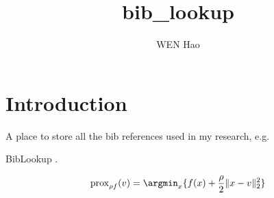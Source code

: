 \documentclass{article}
\title{bib\_lookup}
\author{WEN Hao}
\date{}
\begin{document}
\maketitle

\section{Introduction}

A place to store all the bib references used in my research, e.g. \cite{Wen_cpsc2021,torch_ecg_paper,Kang_2022_cinc2021_iop,wen_cinc2021,Pang_2021_SpineParseNet,kiyasseh2021clocs}

BibLookup \cite{bib_lookup}.

$$\operatorname{prox}_{\rho f}(v) = \argmin_x \{f(x) + \dfrac{\rho}{2} \lVert x-v \rVert_2^2\}$$













\printbibliography[heading=bibliography]
\end{document}
